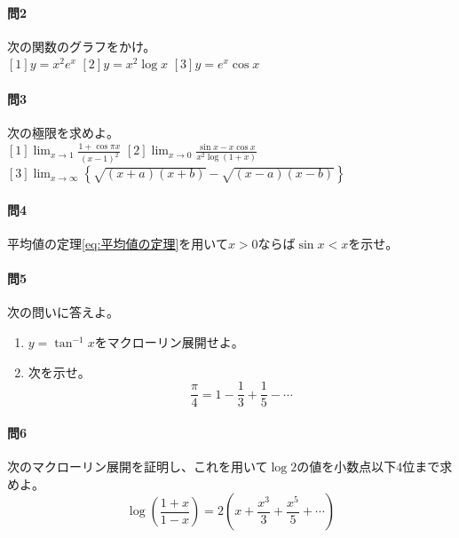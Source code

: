 \documentclass[a4j,dvipdfmx]{jsarticle}
\begin{document}
            \paragraph{問2}次の関数のグラフをかけ。\\
                $[1]y=x^2e^x$\hspace{40mm}
                $[2]y=x^2\log x$\hspace{40mm}
                $[3]y=e^x\cos x$
            \paragraph{問3}次の極限を求めよ。\\
                $\displaystyle[1]\lim_{x\to 1}\frac{1+\cos\pi x}{(x-1)^2}$\hspace{10mm}
                $\displaystyle[2]\lim_{x\to 0}\frac{\sin x-x\cos x}{x^2\log(1+x)}$\hspace{10mm}
                $\displaystyle[3]\lim_{x\to\infty}\left\{\sqrt{(x+a)(x+b)}-\sqrt{(x-a)(x-b)}\right\}$
            \paragraph{問4}平均値の定理\eqref{eq:平均値の定理}を用いて$x>0$ならば$\sin x<x$を示せ。

            \paragraph{問5}次の問いに答えよ。
                \begin{enumerate}
                    \item $y=\tan^{-1}x$をマクローリン展開せよ。
                    \item 次を示せ。
                    \begin{equation*}
                        \frac{\pi}{4}=1-\frac{1}{3}+\frac{1}{5}-\cdots
                    \end{equation*}
                \end{enumerate}
            \paragraph{問6}次のマクローリン展開を証明し、これを用いて$\log 2$の値を小数点以下4位まで求めよ。
                \begin{equation*}
                    \log\left(\frac{1+x}{1-x}\right)=2\left(x+\frac{x^3}{3}+\frac{x^5}{5}+\cdots\right)
                \end{equation*}
            
\end{document}
